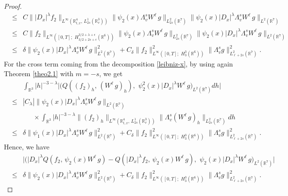 \documentclass{amsart}[12pt, article]
\begin{document}
\begin{proof}
\begin{eqnarray*}
&\leq& C\||D_{x}|^{\lambda} f_2\|_{L^\infty({{{\mathbb R}}}^4_{t, x},\,
L^1_{2s}({{{\mathbb R}}}^3_v))}
 { \|\psi_2(x)\Lambda^{s}_v W^{\ell}\, g\|_{L^2_{2s}({{{\mathbb R}}}^7)}}
\|\psi_2(x)|D_{x}|^{\lambda}\Lambda^{s}_v W^{\ell}\,
g\|_{L^2({{{\mathbb R}}}^7)}\\
&\leq& C\| f_2\|_{L^\infty([0,
T];\,\,H^{3/2+\lambda+\epsilon}_{3/2+2s+\epsilon}({{{\mathbb R}}}^6))}
 { \|\psi_2(x)\Lambda^{s}_v W^{\ell}\, g\|_{L^2_{2s}({{{\mathbb R}}}^7)}}
\|\psi_2(x)|D_{x}|^{\lambda}\Lambda^{s}_v W^{\ell}\,
g\|_{L^2({{{\mathbb R}}}^7)}\\
&\leq& \delta \|\psi_2(x)|D_{x}|^{\lambda}\Lambda^{s}_v W^{\ell}\,
g\|^2_{L^2({{{\mathbb R}}}^7)} +C_\delta \| f_2\|^2_{L^\infty([0,
T];\,\,H^{3}_{3}({{{\mathbb R}}}^6))}
 { \|\Lambda^{s}_v g\|^2_{L^2_{\ell+2s}({{{\mathbb R}}}^7)}} .
\end{eqnarray*}
For the cross term coming {}from the decomposition
\eqref{leibniz-x}, by using again Theorem \ref{theo2.1} with $m=-s$,
we get
\begin{eqnarray*}
&&\int_{{{{\mathbb R}}}^3} |h|^{-3-\lambda}\Big|\Big(Q((f_2)_h,\, (W^{\ell}\,
g)_h),\,\, \psi^2_2(x)|D_{x}|^{\lambda} W^{\ell}\,
g\Big)_{L^2({{{\mathbb R}}}^7)}d h\Big|
\\
&\leq& |C_\lambda| \|\psi_2(x)|D_{x}|^{\lambda}\Lambda^{s}_v
W^{\ell}\, g\|_{L^2({{{\mathbb R}}}^7)}\\
&&\,\,\,\,\,\,\,\,\,\times \int_{{{{\mathbb R}}}^3} |h|^{-3-\lambda} \|
(f_2)_h\| _{L^\infty({{{\mathbb R}}}^4_{t, x},\, L^1_{2s}({{{\mathbb R}}}^3_v))}
\|\Lambda^{s}_v (W^{\ell}\, g)_h\|_{L^2_{2s}({{{\mathbb R}}}^7)}
 d h
\\
&\leq& \delta \|\psi_1(x)|D_{x}|^{\lambda}\Lambda^{s}_v W^{\ell}\,
g\|^2_{L^2({{{\mathbb R}}}^7)} +C_\delta \| f_2\|^2_{L^\infty([0,
T];\,\,H^{3}_{3}({{{\mathbb R}}}^6))}
 { \|\Lambda^{s}_v g\|^2_{L^2_{\ell+2s}({{{\mathbb R}}}^7)}}.
\end{eqnarray*}
Hence, we have
\begin{eqnarray*}
&&\Big|\Big(|D_{x}|^{\lambda}Q(f_2,\, \psi_2(x) W^{\ell}\, g)-
Q(|D_{x}|^{\lambda}f_2,\, \psi_2(x) W^{\ell}\, g),\,\,
\psi_2(x)|D_{x}|^{\lambda} W^{\ell}\, g\Big)_{L^2({{{\mathbb R}}}^7)}\Big|
\\
&\leq& \delta \|\psi_2(x)|D_{x}|^{\lambda}\Lambda^{s}_v W^{\ell}\,
g\|^2_{L^2({{{\mathbb R}}}^7)} +C_\delta \| f_2\|^2_{L^\infty([0,
T];\,\,H^{3}_{3}({{{\mathbb R}}}^6))}
 { \|\Lambda^{s}_v g\|^2_{L^2_{\ell+2s}({{{\mathbb R}}}^7)}} .
\end{eqnarray*}


\end{proof}
\end{document}
